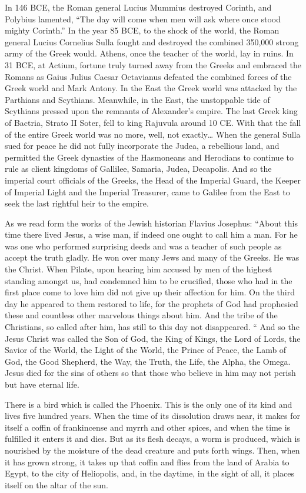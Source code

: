 In 146 BCE, the Roman general Lucius Mummius destroyed Corinth, and Polybius lamented, ``The day will come when men will ask where once stood mighty Corinth.'' In the year 85 BCE, to the shock of the world, the Roman general Lucius Cornelius Sulla fought and destroyed the combined 350,000 strong army of the Greek would.
Athens, once the teacher of the world, lay in ruins.
In 31 BCE, at Actium, fortune truly turned away from the Greeks and embraced the Romans as Gaius Julius Caesar Octavianus defeated the combined forces of the Greek world and Mark Antony.
In the East the Greek world was attacked by the Parthians and Scythians.
Meanwhile, in the East, the unstoppable tide of Scythians pressed upon the remnants of Alexander's empire.
The last Greek king of Bactria, Strato II Soter, fell to king Rajuvula around 10 CE.
With that the fall of the entire Greek world was no more, well, not exactly\ldots{} When the general Sulla sued for peace he did not fully incorporate the Judea, a rebellious land, and permitted the Greek dynasties of the Hasmoneans and Herodians to continue to rule as client kingdoms of Gallilee, Samaria, Judea, Decapolis.
And so the imperial court officials of the Greeks, the Head of the Imperial Guard, the Keeper of Imperial Light and the Imperial Treasurer, came to Galilee from the East to seek the last rightful heir to the empire.

As we read form the works of the Jewish historian Flavius Josephus:
``About this time there lived Jesus, a wise man, if indeed one ought to call him a man.
For he was one who performed surprising deeds and was a teacher of such people as accept the truth gladly.
He won over many Jews and many of the Greeks.
He was the Christ.
When Pilate, upon hearing him accused by men of the highest standing amongst us, had condemned him to be crucified, those who had in the first place come to love him did not give up their affection for him.
On the third day he appeared to them restored to life, for the prophets of God had prophesied these and countless other marvelous things about him.
And the tribe of the Christians, so called after him, has still to this day not disappeared.
``
And so the Jesus Christ was called the Son of God, the King of Kings, the Lord of Lords, the Savior of the World, the Light of the World, the Prince of Peace, the Lamb of God, the Good Shepherd, the Way, the Truth, the Life, the Alpha, the Omega.
Jesus died for the sins of others so that those who believe in him may not perish but have eternal life.

There is a bird which is called the Phoenix.
This is the only one of its kind and lives five hundred years.
When the time of its dissolution draws near, it makes for itself a coffin of frankincense and myrrh and other spices, and when the time is fulfilled it enters it and dies.
But as its flesh decays, a worm is produced, which is nourished by the moisture of the dead creature and puts forth wings.
Then, when it has grown strong, it takes up that coffin and flies from the land of Arabia to Egypt, to the city of Heliopolis, and, in the daytime, in the sight of all, it places itself on the altar of the sun.

